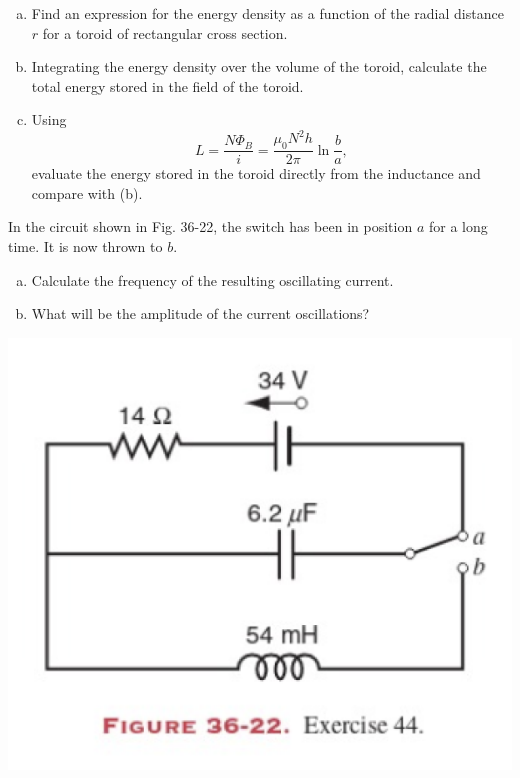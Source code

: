 \documentclass[12pt,letterpaper]{hmcpset}
\begin{document}
	\begin{problem}[36P9:]
		\begin{enumerate}[(a)]
			\item Find an expression for the energy density as a function of the radial distance $r$ for a toroid of rectangular cross section.
			\item Integrating the energy density over the volume of the toroid, calculate the total energy stored in the field of the toroid.
			\item Using
			\[L = \frac{N\Phi_B}{i} = \frac{\mu_0N^2h}{2\pi}\ln{\frac{b}{a}},\]
			evaluate the energy stored in the toroid directly from the inductance and compare with (b).
		\end{enumerate}
	\end{problem}
	\clearpage



	\begin{problem}[36E44:]
		In the circuit shown in Fig. 36-22, the switch has been in position $a$ for a long time.
		It is now thrown to $b$.
		\begin{enumerate}[(a)]
			\item Calculate the frequency of the resulting oscillating current.
			\item What will be the amplitude of the current oscillations?
		\end{enumerate}
		
		\centering\includegraphics[scale = 0.4]{Fig_36-22}
	\end{problem}
	\clearpage
\end{document}
